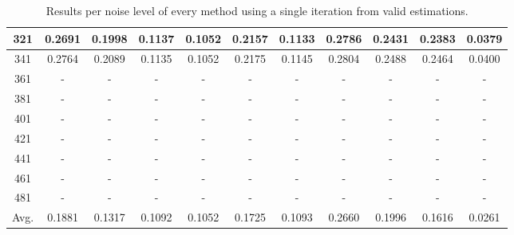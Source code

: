 \begin{table}[ht!]
\begin{tabular}{c|c|c|c|c|c|c|c|c|c|c}
321 & 0.2691 & 0.1998 & 0.1137 & 0.1052 & 0.2157 & 0.1133 & 0.2786 & 0.2431 & 0.2383 & 0.0379 \\ \hline
341 & 0.2764 & 0.2089 & 0.1135 & 0.1052 & 0.2175 & 0.1145 & 0.2804 & 0.2488 & 0.2464 & 0.0400 \\ \hline
361 & - & - & - & - & - & - & - & - & - & - \\ \hline
381 & - & - & - & - & - & - & - & - & - & - \\ \hline
401 & - & - & - & - & - & - & - & - & - & - \\ \hline
421 & - & - & - & - & - & - & - & - & - & - \\ \hline
441 & - & - & - & - & - & - & - & - & - & - \\ \hline
461 & - & - & - & - & - & - & - & - & - & - \\ \hline
481 & - & - & - & - & - & - & - & - & - & - \\ \hline
Avg.  & 0.1881 & 0.1317 & 0.1092 & 0.1052 & 0.1725 & 0.1093 & 0.2660 & 0.1996 & 0.1616 & 0.0261 \\ \hline
\end{tabular}
\caption{Results per noise level of every method using a single iteration from valid estimations.}
\label{tab:1itperNoiseValid}
\end{table}


